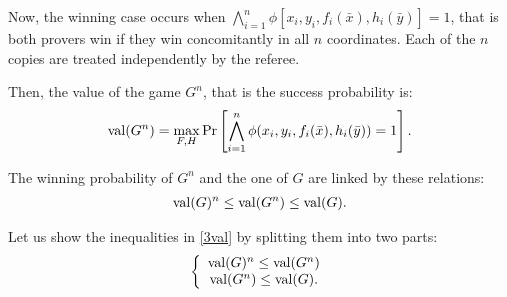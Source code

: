 Now, the winning case occurs when ${\bigwedge\limits_{i=1}^n \phi [x_i,y_i, f_i(\bar{x}), h_i(\bar{y})]=1}$, that is both provers win if they win concomitantly in all $n$ coordinates. Each of the $n$ copies are treated independently by the referee.

Then, the value of the game $G^n$, that is the success probability is:\begin{align*}
\mathrm{val} (G^n) =\max_{F,H}\Pr \left[\bigwedge\limits_{i=1}^n \phi (x_i,y_i, f_i(\bar{x}), h_i(\bar{y}))=1 \right].
\end{align*}

 
The winning probability of $G^n$ and the one of $G$ are linked by these relations: \begin{align} \mathrm{val} (G)^n \leq \mathrm{val} (G^n) \leq \mathrm{val} (G). \label{3val}\end{align}

Let us show the inequalities in \eqref{3val} by splitting them into two parts: 
\begin{align}
\left\lbrace \begin{array}{c} \mathrm{val} (G)^n \leq \mathrm{val} (G^n) \\ \mathrm{val} (G^n) \leq \mathrm{val} (G).  \end{array}\right.
\end{align}

